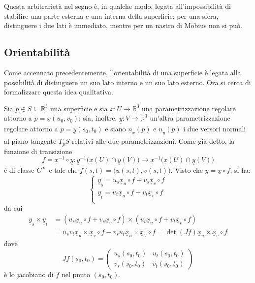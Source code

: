 \documentclass[12pt]{scrartcl}
\theoremstyle{style}
\numberwithin{equation}{subsection}
\begin{document}
Questa arbitrariet\`a nel segno \`e, in qualche modo, legata all'impossibilit\`a di stabilire una parte esterna e una interna della superficie: per una sfera, distinguere i due lati \`e immediato, mentre per un nastro di M\"obius non si pu\`o.
\subsection{Orientabilit\`a}
Come accennato precedentemente, l'orientabilit\`a di una superficie \`e legata alla possibilit\`a di distinguere un suo lato interno e un suo lato esterno.
Ora si cerca di formalizzare questa idea qualitativa.

Sia $p \in S \subseteq \mathbb{R}^3$ una superficie e sia $\underline{x}:U \to \mathbb{R}^3$ una parametrizzazione regolare attorno a $p=\underline{x}(u_0,v_0)$; sia, inoltre, $\underline{y}:V \to \mathbb{R}^3$ un'altra parametrizzazione regolare attorno a $p=\underline{y}(s_0,t_0)$ e siano $\underline{n}_{\underline{x}}(p)$ e $\underline{n}_{\underline{y}}(p) $ i due versori normali al piano tangente $T_pS$ relativi alle due parametrizzazioni.
Come gi\`a detto, la funzione di transizione
\[
f = \underline{x}^{-1}\circ \underline{y}: \underline{y}^{-1}\big(\underline{x}(U)\cap\underline{y}(V)\big)\longrightarrow \underline{x}^{-1}\big(\underline{x}(U)\cap\underline{y}(V)\big)
\] 
\`e di classe $C^\infty$ e tale che $f(s,t) = \big(u(s,t),v(s,t)\big)$.
Visto che $\underline{y}=\underline{x}\circ f$, si ha:
\[
\begin{cases}
	\underline{y}_s = u_s \underline{x}_u\circ f + v_s \underline{x}_v\circ f\\
	\underline{y}_t = u_t \underline{x}_u\circ f + v_t \underline{x}_v\circ f\\
\end{cases}
\] 
da cui
\[
\begin{split}
	\underline{y}_s \times \underline{y}_t&=(u_s \underline{x}_u\circ f + v_s \underline{x}_v\circ f)\times (u_t \underline{x}_u\circ f + v_t \underline{x}_v\circ f)\\
					      &=u_sv_t \underline{x}_u \times \underline{x}_v \circ f - v_su_t \underline{x}_u \times \underline{x}_V \circ f= \det (Jf) \underline{x}_u \times \underline{x}_v \circ f
\end{split}
\] 
dove 
\[
	Jf(s_0,t_0) = \begin{pmatrix} u_s(s_0,t_0) & u_t (s_0,t_0)\\ v_s(s_0,t_0) & v_t (s_0,t_0)\end{pmatrix} 
\] 
\`e lo jacobiano di $f$ nel pnuto $(s_0,t_0)$.
\end{document}
